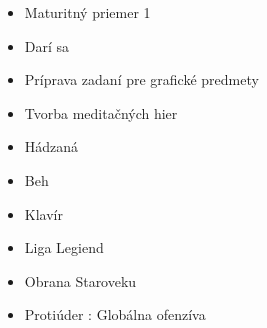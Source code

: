 
\begin{itemize}
    \item Maturitný priemer 1
\end{itemize}

\divider

\begin{itemize}
    \item Darí sa
\end{itemize}

\begin{itemize}
\item Príprava zadaní pre grafické predmety
\end{itemize}
\smallskip
{}
\begin{itemize}
\item Tvorba meditačných hier
\end{itemize}
\smallskip

\begin{itemize}
\item Hádzaná
\item Beh
\end{itemize}
\smallskip
{}
\begin{itemize}
\item Klavír
\end{itemize}
\smallskip
{}
\begin{itemize}
\item Liga Legiend
\item Obrana Staroveku
\item Protiúder : Globálna ofenzíva
\end{itemize}
\smallskip